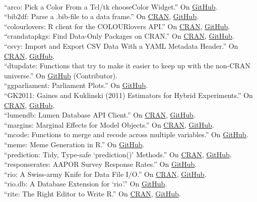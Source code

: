 \documentclass[12pt]{article}
\renewcommand{\section}[1]{\pagebreak[3]%
    \llap{\scshape\smash{\parbox[t]{\marginparwidth}{\raggedright {\color{lg}#1}}}}%
    \vspace{-\baselineskip}\par}
\newcommand{\topic}[1]{\pagebreak[3]\indent {\color{lg}{\footnotesize #1 }}\\}
\newcommand{\entry}[1]{\indent {\color{lg}\guillemotright}\hspace{2pt}#1\vspace{.25em}\\}
\begin{document}
\section{Software}
\topic{R Packages}
	\entry{``arco: Pick a Color From a Tcl/tk chooseColor Widget.'' On \href{https://github.com/leeper/arco}{GitHub}.}
	\entry{``bib2df: Parse a .bib-file to a data frame.'' On \href{https://cran.r-project.org/package=bib2df}{CRAN}, \href{https://github.com/ottlngr/bib2df}{GitHub}.}
	\entry{``colourlovers: R client for the COLOURlovers API.'' On \href{https://cran.r-project.org/package=colourlovers}{CRAN}, \href{https://github.com/leeper/colourlovers}{GitHub}.}
	\entry{``crandatapkgs: Find Data-Only Packages on CRAN.'' On \href{https://cran.r-project.org/package=crandatapkgs}{CRAN}, \href{https://github.com/leeper/crandatapkgs}{GitHub}.}
	\entry{``csvy: Import and Export CSV Data With a YAML Metadata Header.'' On \href{https://cran.r-project.org/package=csvy}{CRAN}, \href{https://github.com/leeper/csvy}{GitHub}.}
	\entry{``dtupdate: Functions that try to make it easier to keep up with the non-CRAN universe.'' On \href{https://github.com/hrbrmstr/dtupdate}{GitHub} (Contributor).}
	\entry{``ggparliament: Parliament Plots.'' On \href{https://github.com/leeper/ggparliament}{GitHub}.}
    \entry{``GK2011: Gaines and Kuklinski (2011) Estimators for Hybrid Experiments.'' On \href{https://cran.r-project.org/package=GK2011}{CRAN}, \href{https://github.com/leeper/GK2011}{GitHub}.}
	\entry{``lumendb: Lumen Database API Client.'' On \href{https://cran.r-project.org/package=lumendb}{CRAN}, \href{https://github.com/leeper/lumendb}{GitHub}.}
	\entry{``margins: Marginal Effects for Model Objects.'' On \href{https://cran.r-project.org/package=margins}{CRAN}, \href{https://github.com/leeper/margins}{GitHub}.}
	\entry{``mcode: Functions to merge and recode across multiple variables.'' On \href{https://github.com/leeper/mcode}{GitHub}.}
	\entry{``meme: Meme Generation in R.'' On \href{https://github.com/leeper/meme}{GitHub}.}
	\entry{``prediction: Tidy, Type-safe `prediction()' Methods.'' On \href{https://cran.r-project.org/package=prediction}{CRAN}, \href{https://github.com/leeper/prediction}{GitHub}.}
	\entry{``responserates: AAPOR Survey Response Rates.'' On \href{https://github.com/leeper/responserates}{GitHub}.}
	\entry{``rio: A Swiss-army Knife for Data File I/O.'' On \href{https://cran.r-project.org/package=rio}{CRAN}, \href{https://github.com/leeper/rio}{GitHub}.}
	\entry{``rio.db: A Database Extension for `rio'.'' On \href{https://github.com/leeper/rio.db}{GitHub}.}
	\entry{``rite: The Right Editor to Write R.'' On \href{https://cran.r-project.org/package=rite}{CRAN}, \href{https://github.com/leeper/rio}{GitHub}.}
\end{document}
